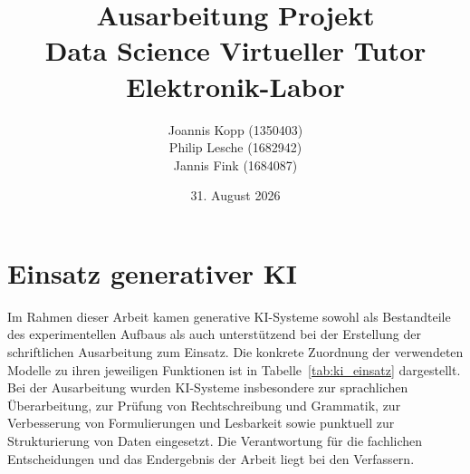 \documentclass[
    12pt,
    a4paper
]{article}
\title{
    \textbf{Ausarbeitung Projekt}\\[0.5cm]
    \large{ Data Science Virtueller Tutor Elektronik-Labor}
}
\author{
    Joannis Kopp (1350403) \\
    Philip Lesche (1682942) \\
    Jannis Fink (1684087)
}
\date{31. August 2026}
\begin{document}
\maketitle
\thispagestyle{empty}

\newpage

\tableofcontents

\newpage

%
%
%
%











\newpage
\printbibliography[
    heading=bibintoc,
    title={References}
]
\section*{Einsatz generativer KI}
\label{sec:ki_einsatz}
 
Im Rahmen dieser Arbeit kamen generative KI-Systeme sowohl als Bestandteile des experimentellen Aufbaus als auch unterstützend bei der Erstellung der schriftlichen Ausarbeitung zum Einsatz. Die konkrete Zuordnung der verwendeten Modelle zu ihren jeweiligen Funktionen ist in Tabelle~\ref{tab:ki_einsatz} dargestellt. Bei der Ausarbeitung wurden KI-Systeme insbesondere zur sprachlichen Überarbeitung, zur Prüfung von Rechtschreibung und Grammatik, zur Verbesserung von Formulierungen und Lesbarkeit sowie punktuell zur Strukturierung von Daten eingesetzt. Die Verantwortung für die fachlichen Entscheidungen und das Endergebnis der Arbeit liegt bei den Verfassern.
 
\end{document}
